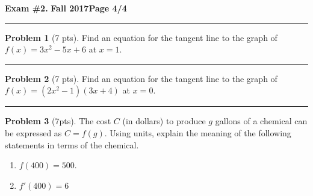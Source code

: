 \documentclass[12pt]{article}
\theoremstyle{definition}
\newtheorem{problem}{Problem}
\begin{document}
\newpage

\hfill{\large\bf Exam \#2.}\hfill{\large\bf
  Fall 2017}\hfill{\large\bf Page 4/4}\hrule

\bigskip

\begin{problem}[7 pts]
Find an equation for the tangent line to the graph of $f(x) = 3x^2-5x+6$ at $x=1$.

\vspace{4cm} 

\begin{flushright}
\end{flushright}
\end{problem}
\hrule

\begin{problem}[7 pts]
Find an equation for the tangent line to the graph of $f(x) = (2x^2-1)(3x+4)$ at $x=0$.

\vspace{5cm} 

\begin{flushright}
\end{flushright}
\end{problem}
\hrule

\begin{problem}[7pts]
The cost $C$ (in dollars) to produce $g$ gallons of a chemical can be expressed as $C = f(g)$.  Using units, explain the meaning of the following statements in terms of the chemical.
\begin{enumerate}
\item $f(400) = 500$.
\begin{flushright}
\end{flushright}

\item $f'(400) = 6$
\begin{flushright}
\end{flushright}
\end{enumerate}
\end{problem}
\end{document}
